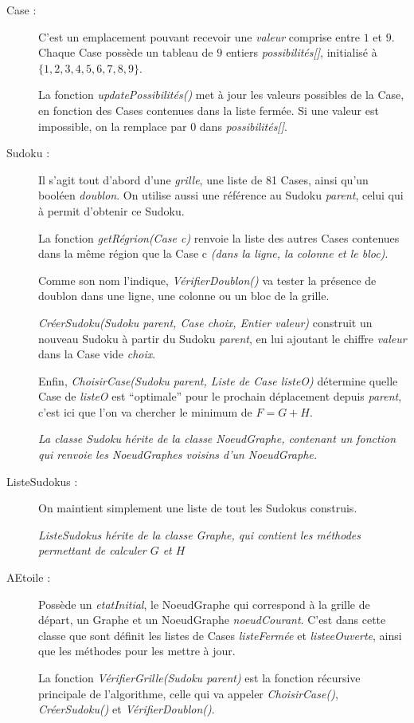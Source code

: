 \begin{description}
\item[Case :] 
C'est un emplacement pouvant recevoir une \textit{valeur} comprise entre $1$ et $9$. Chaque Case possède un tableau de $9$ entiers \textit{possibilités[]}, initialisé à $\{1,2,3,4,5,6,7,8,9\}$.

La fonction \textit{updatePossibilités()} met à jour les valeurs possibles de la Case, en fonction des Cases contenues dans la liste fermée. Si une valeur est impossible, on la remplace par $0$ dans \textit{possibilités[]}.


\item[Sudoku :] Il s'agit tout d'abord d'une \textit{grille}, une liste de 81 Cases, ainsi qu'un booléen \textit{doublon}. On utilise aussi une référence au Sudoku \textit{parent}, celui qui à permit d'obtenir ce Sudoku.

La fonction \textit{getRégrion(Case c)} renvoie la liste des autres Cases contenues dans la même région que la Case c \textit{(dans la ligne, la colonne et le bloc)}.

Comme son nom l'indique, \textit{VérifierDoublon()} va tester la présence de doublon dans une ligne, une colonne ou un bloc de la grille.

\textit{CréerSudoku(Sudoku parent, Case choix, Entier valeur)} construit un nouveau Sudoku à partir du Sudoku \textit{parent}, en lui ajoutant le chiffre \textit{valeur} dans la Case vide \textit{choix}.

Enfin, \textit{ChoisirCase(Sudoku parent, Liste de Case listeO)} détermine quelle Case de \textit{listeO} est ``optimale'' pour le prochain déplacement depuis \textit{parent}, c'est ici que l'on va chercher le minimum de $F=G+H$.

\textit{La classe Sudoku hérite de la classe NoeudGraphe, contenant un fonction qui renvoie les NoeudGraphes voisins d'un NoeudGraphe.}


\item[ListeSudokus : ] On maintient simplement une liste de tout les Sudokus construis.

\textit{ListeSudokus hérite de la classe Graphe, qui contient les méthodes permettant de calculer $G$ et $H$}

\item[AEtoile :] Possède un \textit{etatInitial}, le NoeudGraphe qui correspond à la grille de départ, un Graphe et un NoeudGraphe \textit{noeudCourant}. C'est dans cette classe que sont définit les listes de Cases \textit{listeFermée} et \textit{listeeOuverte}, ainsi que les méthodes pour les mettre à jour.

La fonction \textit{VérifierGrille(Sudoku parent)} est la fonction récursive principale de l'algorithme, celle qui va appeler \textit{ChoisirCase()}, \textit{CréerSudoku()} et \textit{VérifierDoublon()}.



\end{description}



